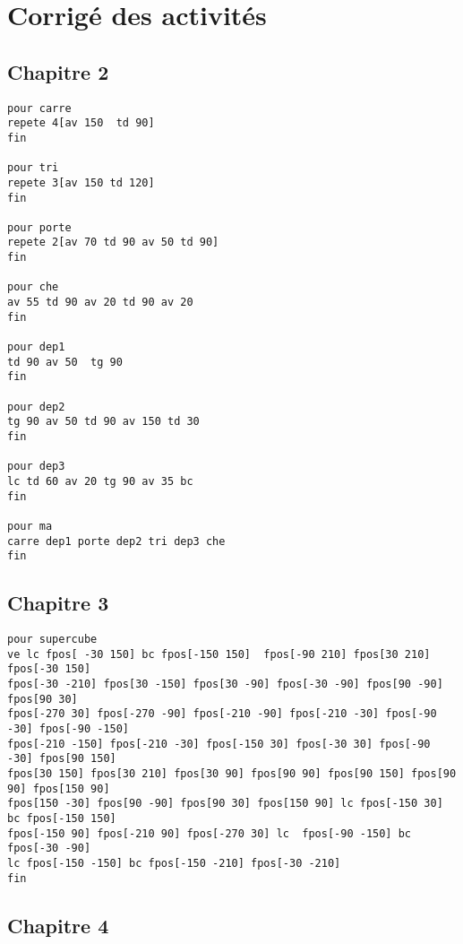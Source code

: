 \chapter{Corrigé des activités}
\section{Chapitre 2}
\begin{verbatim}
pour carre
repete 4[av 150  td 90]
fin

pour tri
repete 3[av 150 td 120]
fin

pour porte
repete 2[av 70 td 90 av 50 td 90]
fin

pour che
av 55 td 90 av 20 td 90 av 20
fin

pour dep1
td 90 av 50  tg 90
fin

pour dep2
tg 90 av 50 td 90 av 150 td 30
fin

pour dep3
lc td 60 av 20 tg 90 av 35 bc
fin

pour ma
carre dep1 porte dep2 tri dep3 che
fin

\end{verbatim}

\section{Chapitre 3}
\begin{verbatim}
pour supercube
ve lc fpos[ -30 150] bc fpos[-150 150]  fpos[-90 210] fpos[30 210] fpos[-30 150]
fpos[-30 -210] fpos[30 -150] fpos[30 -90] fpos[-30 -90] fpos[90 -90] fpos[90 30]  
fpos[-270 30] fpos[-270 -90] fpos[-210 -90] fpos[-210 -30] fpos[-90 -30] fpos[-90 -150]
fpos[-210 -150] fpos[-210 -30] fpos[-150 30] fpos[-30 30] fpos[-90 -30] fpos[90 150]
fpos[30 150] fpos[30 210] fpos[30 90] fpos[90 90] fpos[90 150] fpos[90 90] fpos[150 90]
fpos[150 -30] fpos[90 -90] fpos[90 30] fpos[150 90] lc fpos[-150 30] bc fpos[-150 150] 
fpos[-150 90] fpos[-210 90] fpos[-270 30] lc  fpos[-90 -150] bc fpos[-30 -90]
lc fpos[-150 -150] bc fpos[-150 -210] fpos[-30 -210]
fin
\end{verbatim}

\section{Chapitre 4}
